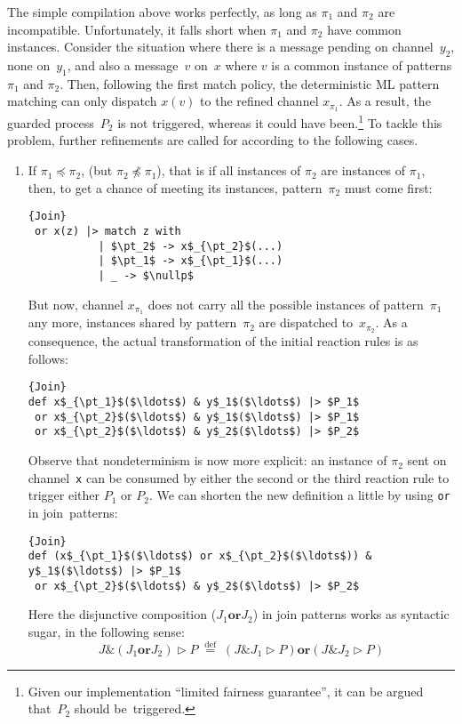 \documentclass{LMCS}
\let \lst \lstinline
\newcommand{\pt}{\pi}
\newcommand{\kwd}[1]{\ensuremath{\mathbf{#1}}}
\newcommand{\infix}[1]{\mathrel{\kwd {#1}}}
\newcommand{\id}[1]{\textit{#1}}
\renewcommand{\_}{\mathord{\rule[-.25ex]{1ex}{.15ex}}}
\newcommand{\nullp}{0}
\newcommand{\defineas}{\;\stackrel{\mathrm{def}}=\;}
\newcommand{\para}[2]{#1\mathop{\&}#2}
\newcommand{\dis}[2]{#1\infix{or}#2}
\newcommand{\reaction}[2]{#1 \triangleright #2}
\begin{document}
The simple compilation above works perfectly, as long as $\pt_1$ and
$\pt_2$ are incompatible. Unfortunately, it falls short when $\pt_1$
and $\pt_2$ have common instances.
Consider the situation where there is a message pending
on channel~$\id{y}_2$, none on~$\id{y}_1$, and also a message~$v$
on~$\id{x}$ where $v$ is a common instance of patterns $\pt_1$ and $\pt_2$.
Then, following the first match policy, the
deterministic ML pattern matching can only dispatch $\id{x}(v)$ to the
refined channel $\id{x}_{\pt_1}$.
As a result, the guarded process~$P_2$ is not
triggered, whereas it could have been.\footnote{Given
our implementation ``limited fairness guarantee'', it
can be argued that~$P_2$ should be~triggered.}
To tackle this problem, further
refinements are called for according to the following cases.
\begin{enumerate}[$\bullet$]
\item If $\pt_1 \preceq \pt_2$, (but $\pt_2 \not\preceq \pt_1$), that
  is if all instances of $\pt_2$ are instances of $\pt_1$, then, to
  get a chance of meeting its instances, pattern~$\pt_2$ must come
  first:
\begin{lstlisting}{Join}
 or x(z) |> match z with
           | $\pt_2$ -> x$_{\pt_2}$(...)
           | $\pt_1$ -> x$_{\pt_1}$(...)
           | _ -> $\nullp$
\end{lstlisting}
But now, channel $\id{x}_{\pt_1}$ does not carry all the possible
instances of pattern~$\pt_1$ any more, instances shared by
pattern~$\pt_2$ are dispatched to~$\id{x}_{\pt_2}$. As a consequence,
the actual transformation of the initial reaction rules is as follows:
\begin{lstlisting}{Join}
def x$_{\pt_1}$($\ldots$) & y$_1$($\ldots$) |> $P_1$
 or x$_{\pt_2}$($\ldots$) & y$_1$($\ldots$) |> $P_1$
 or x$_{\pt_2}$($\ldots$) & y$_2$($\ldots$) |> $P_2$
\end{lstlisting}
Observe that nondeterminism is now more explicit: an instance of
$\pt_2$ sent on channel~\lst"x" can be consumed by either the second
or the third reaction rule to trigger either $P_1$ or $P_2$.  We can
shorten the new definition a little by using \lst"or" in
join~patterns:
\begin{lstlisting}{Join}
def (x$_{\pt_1}$($\ldots$) or x$_{\pt_2}$($\ldots$)) & y$_1$($\ldots$) |> $P_1$
 or x$_{\pt_2}$($\ldots$) & y$_2$($\ldots$) |> $P_2$
\end{lstlisting}
Here the disjunctive composition ($\dis{J_1}{J_2}$) in join patterns
works as syntactic sugar, in the following sense: $$
\reaction{\para{J}{(\dis{J_1}{J_2})}}{P} \defineas
\dis{(\reaction{\para{J}{J_1}}{P})}{(\reaction{\para{J}{J_2}}{P})} $$



\end{enumerate}
\end{document}
